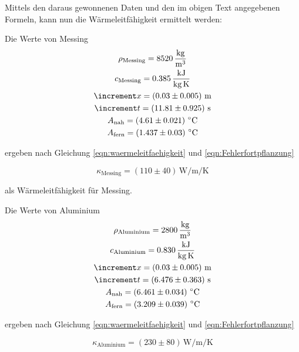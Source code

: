 Mittels den daraus gewonnenen Daten und den im obigen Text angegebenen Formeln, kann nun die Wärmeleitfähigkeit ermittelt werden:

Die Werte von Messing
\begin{gather*}
  \rho_\text{Messing} = 8520\,\unit[per-mode=fraction]{\kilo\gram\per\cubic\meter} \\
  c_\text{Messing} = 0.385\,\unit{\kilo\joule\per\kilo\gram\per\kelvin} \\
  \increment x = \left(0.03\pm0.005\right)\,\unit{\meter} \\
  \increment t = \left(11.81\pm0.925\right)\,\unit{\second} \\
  A_\text{nah} = \left(4.61\pm0.021\right)\,\unit{\celsius}\\
  A_\text{fern} = \left(1.437\pm0.03\right)\,\unit{\celsius}\\
\end{gather*}

ergeben nach Gleichung \eqref{eqn:waermeleitfaehigkeit} und \eqref{eqn:Fehlerfortpflanzung}

\begin{equation}
  \kappa_\text{Messing} = \left(110\pm40\right)\,\unit{\watt\per\meter\per\kelvin}
\end{equation}

als Wärmeleitfähigkeit für Messing.
\hfill \break

Die Werte von Aluminium
\begin{gather*}
  \rho_\text{Aluminium} = 2800\,\unit[per-mode=fraction]{\kilo\gram\per\cubic\meter} \\
  c_\text{Aluminium} = 0.830\,\unit{\kilo\joule\per\kilo\gram\per\kelvin} \\
  \increment x = \left(0.03\pm0.005\right)\,\unit{\meter} \\
  \increment t = \left(6.476\pm0.363\right)\,\unit{\second} \\
  A_\text{nah} = \left(6.461\pm0.034\right)\,\unit{\celsius}\\
  A_\text{fern} = \left(3.209\pm0.039\right)\,\unit{\celsius}\\
\end{gather*}

ergeben nach Gleichung \eqref{eqn:waermeleitfaehigkeit} und \eqref{eqn:Fehlerfortpflanzung}

\begin{equation}
  \kappa_\text{Aluminium} = \left(230\pm80\right)\,\unit{\watt\per\meter\per\kelvin}
\end{equation}


